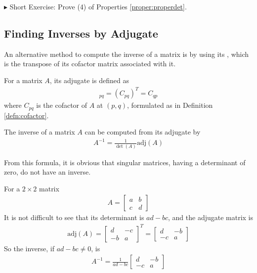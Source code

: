 $\blacktriangleright$ Short Exercise: Prove (4) of Properties \ref{proper:properdet}.\footnotemark

\subsection{Finding Inverses by Adjugate}
An alternative method to compute the inverse of a matrix is by using its , which is the transpose of its cofactor matrix associated with it.
\begin{defn}[Adjugate]
For a matrix $A$, its adjugate is defined as
\begin{align}
[\text{adj}(A)]_{pq} = (C_{pq})^T = C_{qp}
\end{align}
where $C_{pq}$ is the cofactor of $A$ at $(p, q)$, formulated as in Definition \ref{defn:cofactor}.
\end{defn}
\begin{proper}
\label{proper:invadj}
The inverse of a matrix $A$ can be computed from its adjugate by
\begin{align}
A^{-1} = \frac{1}{\det(A)}\text{adj}(A)
\end{align}
\end{proper}
From this formula, it is obvious that singular matrices, having a determinant of zero, do not have an inverse.
\begin{exmp}
\label{exmp:2x2}
For a $2 \times 2$ matrix
\begin{align*}
A = \begin{bmatrix}
a & b \\
c & d
\end{bmatrix}    
\end{align*}
It is not difficult to see that its determinant is $ad - bc$, and the adjugate matrix is
\begin{align*}
\text{adj}(A) = 
\begin{bmatrix}
d & -c \\
-b & a 
\end{bmatrix}^T = 
\begin{bmatrix}
d & -b \\
-c & a 
\end{bmatrix}    
\end{align*}
So the inverse, if $ad - bc \neq 0$, is
\begin{align}
A^{-1} = 
\frac{1}{ad-bc}
\begin{bmatrix}
d & -b \\
-c & a 
\end{bmatrix}
\label{eqn:2times2inv}
\end{align}
\end{exmp}

